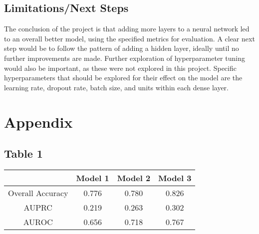 \documentclass{article}
\begin{document}
\begin{multicols}{2}
\section{Limitations/Next Steps}
The conclusion of the project is that adding more layers to a neural network led to an overall better model, using the specified metrics for evaluation. A clear next step would be to follow the pattern of adding a hidden layer, ideally until no further improvements are made. Further exploration of hyperparameter tuning would also be important, as these were not explored in this project. Specific hyperparameters that should be explored for their effect on the model are the learning rate, dropout rate, batch size, and units within each dense layer.

\end{multicols}

\section{Appendix}
\subsection{Table 1}
\begin{center}

\begin{tabular}{||c c c c||}
 \hline
 \ & Model 1 & Model 2 & Model 3 \\ [0.5ex] 
 \hline\hline
 Overall Accuracy & 0.776 & 0.780 & 0.826 \\ 
 \hline
 AUPRC & 0.219 & 0.263 & 0.302 \\
 \hline
 AUROC & 0.656 & 0.718 & 0.767 \\
 \hline
\end{tabular}
\end{center}
\end{document}
